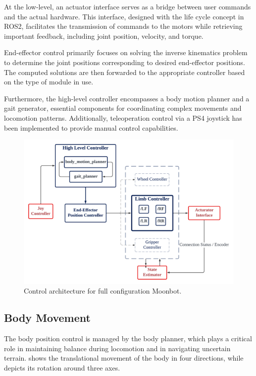 At the low-level, an actuator interface serves as a bridge between user commands and the actual hardware. This interface, designed with the life cycle concept in ROS2, facilitates the transmission of commands to the motors while retrieving important feedback, including joint position, velocity, and torque.

End-effector control primarily focuses on solving the inverse kinematics problem to determine the joint positions corresponding to desired end-effector positions. The computed solutions are then forwarded to the appropriate controller based on the type of module in use.

Furthermore, the high-level controller encompasses a body motion planner and a gait generator, essential components for coordinating complex movements and locomotion patterns. Additionally, teleoperation control via a PS4 joystick has been implemented to provide manual control capabilities.\\

\begin{figure}[t]
  \centering
  \includegraphics[width=145mm]{./fig/flowchart/Controlcolor.png}
  \vspace{2mm}
  \caption{Control architecture for full configuration Moonbot.}\label{control}
\end{figure}


\subsection{Body Movement}
The body position control is managed by the body planner, which plays a critical role in maintaining balance during locomotion and in navigating uncertain terrain.  shows the translational movement of the body in four directions, while  depicts its rotation around three axes. \\

